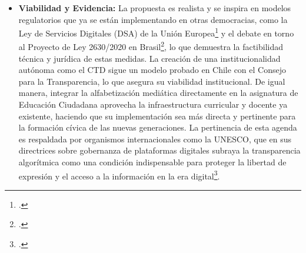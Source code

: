\documentclass[12pt, letterpaper]{article}
\begin{document}
\begin{itemize}[leftmargin=*, itemsep=0.5em]
	\item \textbf{Viabilidad y Evidencia:} La propuesta es realista y se inspira en modelos regulatorios que ya se están implementando en otras democracias, como la Ley de Servicios Digitales (DSA) de la Unión Europea\footcite{european_commission_dsa} y el debate en torno al Proyecto de Ley 2630/2020 en Brasil\footcite{brasil_2020}, lo que demuestra la factibilidad técnica y jurídica de estas medidas. La creación de una institucionalidad autónoma como el CTD sigue un modelo probado en Chile con el Consejo para la Transparencia, lo que asegura su viabilidad institucional. De igual manera, integrar la alfabetización mediática directamente en la asignatura de Educación Ciudadana aprovecha la infraestructura curricular y docente ya existente, haciendo que su implementación sea más directa y pertinente para la formación cívica de las nuevas generaciones. La pertinencia de esta agenda es respaldada por organismos internacionales como la UNESCO, que en sus directrices sobre gobernanza de plataformas digitales subraya la transparencia algorítmica como una condición indispensable para proteger la libertad de expresión y el acceso a la información en la era digital\footcite{unesco_2023}.
\end{itemize}

\newpage
\printbibliography[title=Bibliografía]
\end{document}

